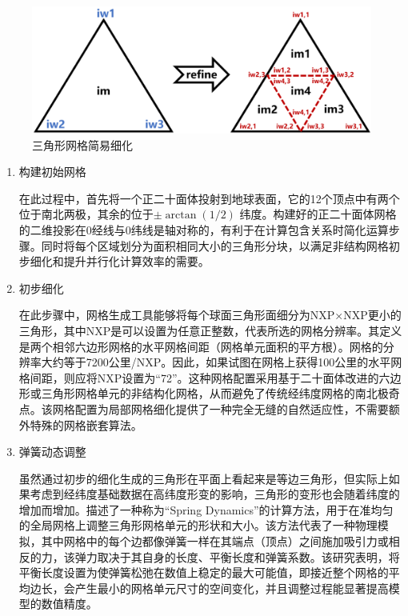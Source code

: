 {
\begin{figure}[htbp]
\centering
\includegraphics[width=\textwidth]{Figures/模式构架/三角形网格简易细化.png}
\caption{三角形网格简易细化}
\label{fig:三角形网格简易细化}
\end{figure}
}

\begin{enumerate}
\item 构建初始网格

在此过程中，首先将一个正二十面体投射到地球表面，它的12个顶点中有两个位于南北两极，其余的位于$\pm\arctan(1/2)$ 纬度。构建好的正二十面体网格的二维投影在0\textdegree 经线与0\textdegree 纬线是轴对称的，有利于在计算包含关系时简化运算步骤。同时将每个区域划分为面积相同大小的三角形分块，以满足非结构网格初步细化和提升并行化计算效率的需要。

\item 初步细化

在此步骤中，网格生成工具能够将每个球面三角形面细分为NXP×NXP更小的三角形，其中NXP是可以设置为任意正整数，代表所选的网格分辨率。其定义是两个相邻六边形网格的水平网格间距（网格单元面积的平方根）。网格的分辨率大约等于7200公里/NXP。因此，如果试图在网格上获得100公里的水平网格间距，则应将NXP设置为“72”。这种网格配置采用基于二十面体改进的六边形或三角形网格单元的非结构化网格，从而避免了传统经纬度网格的南北极奇点。该网格配置为局部网格细化提供了一种完全无缝的自然适应性，不需要额外特殊的网格嵌套算法。

\item 弹簧动态调整

虽然通过初步的细化生成的三角形在平面上看起来是等边三角形，但实际上如果考虑到经纬度基础数据在高纬度形变的影响，三角形的变形也会随着纬度的增加而增加。\citet{tomita2002optimization}描述了一种称为“Spring Dynamics”的计算方法，用于在准均匀的全局网格上调整三角形网格单元的形状和大小。该方法代表了一种物理模拟，其中网格中的每个边都像弹簧一样在其端点（顶点）之间施加吸引力或相反的力，该弹力取决于其自身的长度、平衡长度和弹簧系数。该研究表明，将平衡长度设置为使弹簧松弛在数值上稳定的最大可能值，即接近整个网格的平均边长，会产生最小的网格单元尺寸的空间变化，并且调整过程能显著提高模型的数值精度。


\end{enumerate}
